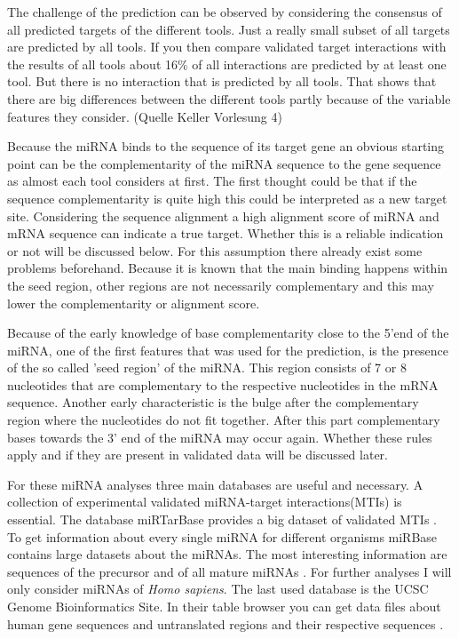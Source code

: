\documentclass[12pt]{article}
\begin{document}
The challenge of the prediction can be observed by considering the consensus of all predicted targets of the different tools.  Just a really small subset of all targets are predicted by all tools. If you then compare validated target interactions with the results of all tools about 16\% of all interactions are predicted by at least one tool. But there is no interaction that is predicted by all tools. That shows that there are big differences between the different tools partly because of the variable features they consider. (Quelle Keller Vorlesung 4) 

Because the miRNA binds to the sequence of its target gene an obvious starting point can be the complementarity of the miRNA sequence to the gene sequence as almost each tool considers at first. The first thought could be that if the sequence complementarity is quite high this could be interpreted as a new target site. Considering the sequence alignment a high alignment score of miRNA and mRNA sequence can indicate a true target. Whether this is a reliable indication or not will be discussed below. For this assumption there already exist some problems beforehand. Because it is known that the main binding happens within the seed region, other regions are not necessarily complementary and this may lower the complementarity or alignment score. 

Because of the early knowledge of base complementarity close to the 5'end of the miRNA, one of the first features that was used for the prediction, is the presence of the so called 'seed region' of the miRNA. This region consists of 7 or 8 nucleotides that are complementary to the respective nucleotides in the mRNA sequence. Another early characteristic is the bulge after the complementary region where the nucleotides do not fit together. After this part complementary bases towards the 3' end of the miRNA may occur again. Whether these rules apply and if they are present in validated data will be discussed later. 

For these miRNA analyses three main databases are useful and necessary. A collection of experimental validated miRNA-target interactions(MTIs) is essential. The database miRTarBase provides a big dataset of validated MTIs \cite{Hsu}. To get information about every single miRNA for different organisms miRBase contains large datasets about the miRNAs. The most interesting information are sequences of the precursor and of all mature miRNAs \cite{mirbase}. For further analyses I will only consider miRNAs of \textit{Homo sapiens}. The last used database is the UCSC Genome Bioinformatics Site. In their table browser you can get data files about human gene sequences and untranslated regions and their respective sequences \cite{ucsc}.
  
\end{document}
